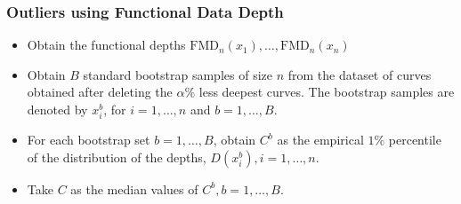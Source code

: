 \documentclass[10pt,dvipsnames,table]{beamer}
\begin{document}
\begin{frame}
\frametitle{Outliers using Functional Data Depth}
\begin{itemize}
\item Obtain the functional depths $\text{FMD}_n(x_1), \dots, \text{FMD}_n(x_n)$
\item Obtain $B$ standard bootstrap samples of size $n$ from the dataset of curves obtained after deleting the $\alpha \%$ less deepest curves. The bootstrap samples are denoted by $x_i^b$, for $i = 1, \dots, n$ and $b = 1, \dots, B$.
\item For each bootstrap set $b = 1, \dots, B$, obtain $C^b$ as the empirical $1\%$ percentile of the distribution of the depths, $D(x_i^b), i = 1, \dots, n$.
\item Take $C$ as the median values of $C^b, b = 1, \dots, B$.
\end{itemize}
\end{frame}
\end{document}

